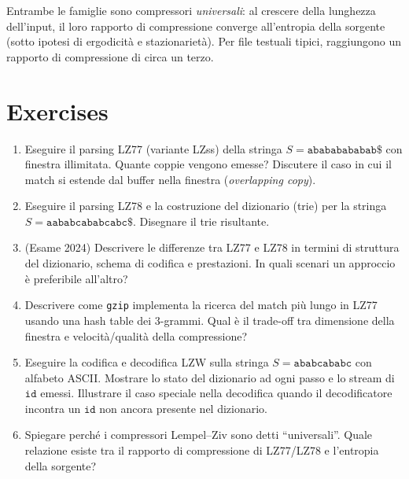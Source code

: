 \documentclass[12pt, a4paper, oneside]{book}
\theoremstyle{plain}
\theoremstyle{definition}
\theoremstyle{remark}
\begin{document}
Entrambe le famiglie sono compressori \emph{universali}: al crescere della lunghezza dell'input, il loro rapporto di compressione converge all'entropia della sorgente (sotto ipotesi di ergodicità e stazionarietà). Per file testuali tipici, raggiungono un rapporto di compressione di circa un terzo.

\section{Exercises}

\begin{enumerate}
  \item Eseguire il parsing LZ77 (variante LZss) della stringa $S = \texttt{abababababab\$}$ con finestra illimitata. Quante coppie vengono emesse? Discutere il caso in cui il match si estende dal buffer nella finestra (\emph{overlapping copy}).

  \item Eseguire il parsing LZ78 e la costruzione del dizionario (trie) per la stringa $S = \texttt{aababcababcabc\$}$. Disegnare il trie risultante.

  \item (Esame 2024) Descrivere le differenze tra LZ77 e LZ78 in termini di struttura del dizionario, schema di codifica e prestazioni. In quali scenari un approccio è preferibile all'altro?

  \item Descrivere come \texttt{gzip} implementa la ricerca del match più lungo in LZ77 usando una hash table dei 3-grammi. Qual è il trade-off tra dimensione della finestra e velocità/qualità della compressione?

  \item Eseguire la codifica e decodifica LZW sulla stringa $S = \texttt{ababcababc}$ con alfabeto ASCII. Mostrare lo stato del dizionario ad ogni passo e lo stream di $\mathtt{id}$ emessi. Illustrare il caso speciale nella decodifica quando il decodificatore incontra un $\mathtt{id}$ non ancora presente nel dizionario.

  \item Spiegare perché i compressori Lempel--Ziv sono detti ``universali''. Quale relazione esiste tra il rapporto di compressione di LZ77/LZ78 e l'entropia della sorgente?
\end{enumerate}

\end{document}
